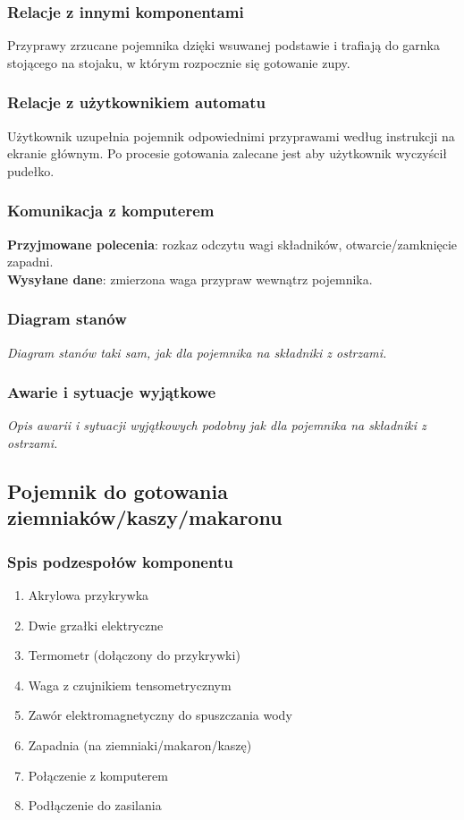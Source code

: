 \documentclass[12pt,a4paper,notitlepage]{article}
\begin{document}
\subsubsection{Relacje z innymi komponentami}
Przyprawy zrzucane pojemnika dzięki wsuwanej podstawie i trafiają do garnka stojącego na stojaku, w którym rozpocznie się gotowanie zupy.

\subsubsection{Relacje z użytkownikiem automatu}
Użytkownik uzupełnia pojemnik odpowiednimi przyprawami według instrukcji na ekranie głównym. Po procesie gotowania zalecane jest aby użytkownik wyczyścił pudełko.

\subsubsection{Komunikacja z komputerem}
\textbf{Przyjmowane polecenia}: rozkaz odczytu wagi składników, otwarcie/zamknięcie zapadni.\\
\textbf{Wysyłane dane}: zmierzona waga przypraw wewnątrz pojemnika.

\subsubsection{Diagram stanów}
\emph{Diagram stanów taki sam, jak dla pojemnika na składniki z ostrzami.}

\subsubsection{Awarie i sytuacje wyjątkowe}
\emph{Opis awarii i sytuacji wyjątkowych podobny jak dla pojemnika na składniki z ostrzami.}


\subsection{Pojemnik do gotowania ziemniaków/kaszy/makaronu}
\subsubsection{Spis podzespołów komponentu}
\begin{enumerate}
  \item Akrylowa przykrywka
  \item Dwie grzałki elektryczne
  \item Termometr (dołączony do przykrywki)
  \item Waga z czujnikiem tensometrycznym
  \item Zawór elektromagnetyczny do spuszczania wody
  \item Zapadnia (na ziemniaki/makaron/kaszę)
  \item Połączenie z komputerem
  \item Podłączenie do zasilania
\end{enumerate}
\end{document}
